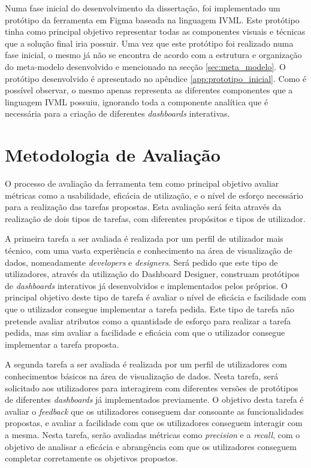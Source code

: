 Numa fase inicial do desenvolvimento da dissertação, foi implementado um protótipo da ferramenta em Figma \cite{figma} baseada na linguagem \gls{IVML}. Este protótipo tinha como principal objetivo representar todas as componentes visuais e técnicas que a solução final iria possuir. Uma vez que este protótipo foi realizado numa fase inicial, o mesmo já não se encontra de acordo com a estrutura e organização do meta-modelo desenvolvido e mencionado na secção \ref{sec:meta_modelo}. O protótipo desenvolvido é apresentado no apêndice \ref{app:prototipo_inicial}. Como é possível observar, o mesmo apenas representa as diferentes componentes que a linguagem \gls{IVML} possuiu, ignorando toda a componente analítica que é necessária para a criação de diferentes \textit{dashboards} interativas.

\section{Metodologia de Avaliação} %
\label{sec:metodologia_avaliacao}

O processo de avaliação da ferramenta tem como principal objetivo avaliar métricas como a usabilidade, eficácia de utilização, e o nível de esforço necessário para a realização das tarefas propostas. Esta avaliação será feita através da realização de dois tipos de tarefas, com diferentes propósitos e tipos de utilizador.

A primeira tarefa a ser avaliada é realizada por um perfil de utilizador mais técnico, com uma vasta experiência e conhecimento na área de visualização de dados, nomeadamente \textit{developers} e \textit{designers}. Será pedido que este tipo de utilizadores, através da utilização do Dashboard Designer, construam protótipos de \textit{dashboards} interativos já desenvolvidos e implementados pelos próprios. O principal objetivo deste tipo de tarefa é avaliar o nível de eficácia e facilidade com que o utilizador consegue implementar a tarefa pedida. Este tipo de tarefa não pretende avaliar atributos como a quantidade de esforço para realizar a tarefa pedida, mas sim avaliar a facilidade e eficácia com que o utilizador consegue implementar a tarefa proposta.

A segunda tarefa a ser avaliada é realizada por um perfil de utilizadores com conhecimentos básicos na área de visualização de dados. Nesta tarefa, será solicitado aos utilizadores para interagirem com diferentes versões de protótipos de diferentes \textit{dashboards} já implementados previamente. O objetivo desta tarefa é avaliar o \textit{feedback} que os utilizadores conseguem dar consoante as funcionalidades propostas, e avaliar a facilidade com que os utilizadores conseguem interagir com a mesma. Nesta tarefa, serão avaliadas métricas como \textit{precision} e a \textit{recall}, com o objetivo de analisar a eficácia e abrangência com que os utilizadores conseguem completar corretamente os objetivos propostos.

